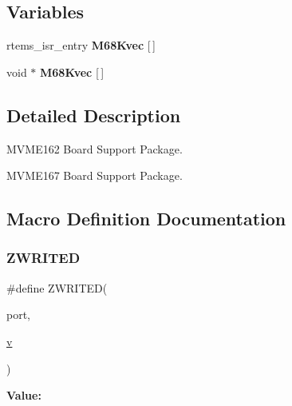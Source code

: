 \subsection*{Variables}
\begin{DoxyCompactItemize}
\item 
\mbox{\label{group__RTEMSBSPsM68kMVME162_ga744e8a50e2dcbb8fb7e6b0c7554008f9}} 
rtems\+\_\+isr\+\_\+entry {\bfseries M68\+Kvec} \mbox{[}$\,$\mbox{]}
\item 
\mbox{\label{group__RTEMSBSPsM68kMVME162_gaaae1ff9ffecdbd35b9d23a2c89bcdac9}} 
void $\ast$ {\bfseries M68\+Kvec} \mbox{[}$\,$\mbox{]}
\end{DoxyCompactItemize}


\subsection{Detailed Description}
M\+V\+M\+E162 Board Support Package. 

M\+V\+M\+E167 Board Support Package.

\subsection{Macro Definition Documentation}
\mbox{\label{group__RTEMSBSPsM68kMVME162_gae9ee522e25e5e4851ce17e7357f6dac2}} 
\subsubsection{\texorpdfstring{ZWRITED}{ZWRITED}}
{\footnotesize\ttfamily \#define Z\+W\+R\+I\+T\+ED(\begin{DoxyParamCaption}\item[{}]{port,  }\item[{}]{\mbox{\hyperlink{sun4u_2tte_8h_a0b943bd7a9fc74d6635879a38dc16894}{v}} }\end{DoxyParamCaption})}

{\bfseries Value\+:}
\begin{DoxyCode}{0}

\end{DoxyCode}


